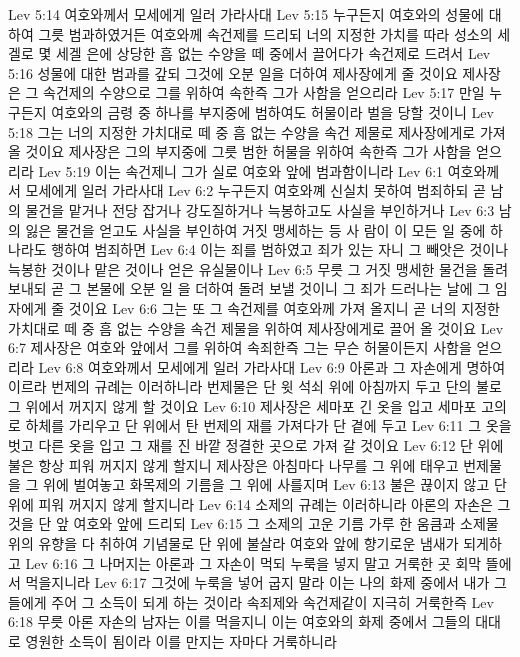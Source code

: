 Lev 5:14  여호와께서 모세에게 일러 가라사대
Lev 5:15  누구든지 여호와의 성물에 대하여 그릇 범과하였거든 여호와께 속건제를 드리되 너의 지정한 가치를 따라 성소의 세겔로 몇 세겔 은에 상당한 흠 없는 수양을 떼 중에서 끌어다가 속건제로 드려서
Lev 5:16  성물에 대한 범과를 갚되 그것에 오분 일을 더하여 제사장에게 줄 것이요 제사장은 그 속건제의 수양으로 그를 위하여 속한즉 그가 사함을 얻으리라
Lev 5:17  만일 누구든지 여호와의 금령 중 하나를 부지중에 범하여도 허물이라 벌을 당할 것이니
Lev 5:18  그는 너의 지정한 가치대로 떼 중 흠 없는 수양을 속건 제물로 제사장에게로 가져올 것이요 제사장은 그의 부지중에 그릇 범한 허물을 위하여 속한즉 그가 사함을 얻으리라
Lev 5:19  이는 속건제니 그가 실로 여호와 앞에 범과함이니라
Lev 6:1  여호와께서 모세에게 일러 가라사대
Lev 6:2  누구든지 여호와꼐 신실치 못하여 범죄하되 곧 남의 물건을 맡거나 전당 잡거나 강도질하거나 늑봉하고도 사실을 부인하거나
Lev 6:3  남의 잃은 물건을 얻고도 사실을 부인하여 거짓 맹세하는 등 사 람이 이 모든 일 중에 하나라도 행하여 범죄하면
Lev 6:4  이는 죄를 범하였고 죄가 있는 자니 그 빼앗은 것이나 늑봉한 것이나 맡은 것이나 얻은 유실물이나
Lev 6:5  무릇 그 거짓 맹세한 물건을 돌려 보내되 곧 그 본물에 오분 일 을 더하여 돌려 보낼 것이니 그 죄가 드러나는 날에 그 임자에게 줄 것이요
Lev 6:6  그는 또 그 속건제를 여호와께 가져 올지니 곧 너의 지정한 가치대로 떼 중 흠 없는 수양을 속건 제물을 위하여 제사장에게로 끌어 올 것이요
Lev 6:7  제사장은 여호와 앞에서 그를 위하여 속죄한즉 그는 무슨 허물이든지 사함을 얻으리라
Lev 6:8  여호와께서 모세에게 일러 가라사대
Lev 6:9  아론과 그 자손에게 명하여 이르라 번제의 규례는 이러하니라 번제물은 단 윗 석쇠 위에 아침까지 두고 단의 불로 그 위에서 꺼지지 않게 할 것이요
Lev 6:10  제사장은 세마포 긴 옷을 입고 세마포 고의로 하체를 가리우고 단 위에서 탄 번제의 재를 가져다가 단 곁에 두고
Lev 6:11  그 옷을 벗고 다른 옷을 입고 그 재를 진 바깥 정결한 곳으로 가져 갈 것이요
Lev 6:12  단 위에 불은 항상 피워 꺼지지 않게 할지니 제사장은 아침마다 나무를 그 위에 태우고 번제물을 그 위에 벌여놓고 화목제의 기름을 그 위에 사를지며
Lev 6:13  불은 끊이지 않고 단 위에 피워 꺼지지 않게 할지니라
Lev 6:14  소제의 규례는 이러하니라 아론의 자손은 그것을 단 앞 여호와 앞에 드리되
Lev 6:15  그 소제의 고운 기름 가루 한 움큼과 소제물 위의 유향을 다 취하여 기념물로 단 위에 불살라 여호와 앞에 향기로운 냄새가 되게하고
Lev 6:16  그 나머지는 아론과 그 자손이 먹되 누룩을 넣지 말고 거룩한 곳 회막 뜰에서 먹을지니라
Lev 6:17  그것에 누룩을 넣어 굽지 말라 이는 나의 화제 중에서 내가 그들에게 주어 그 소득이 되게 하는 것이라 속죄제와 속건제같이 지극히 거룩한즉
Lev 6:18  무릇 아론 자손의 남자는 이를 먹을지니 이는 여호와의 화제 중에서 그들의 대대로 영원한 소득이 됨이라 이를 만지는 자마다 거룩하니라
